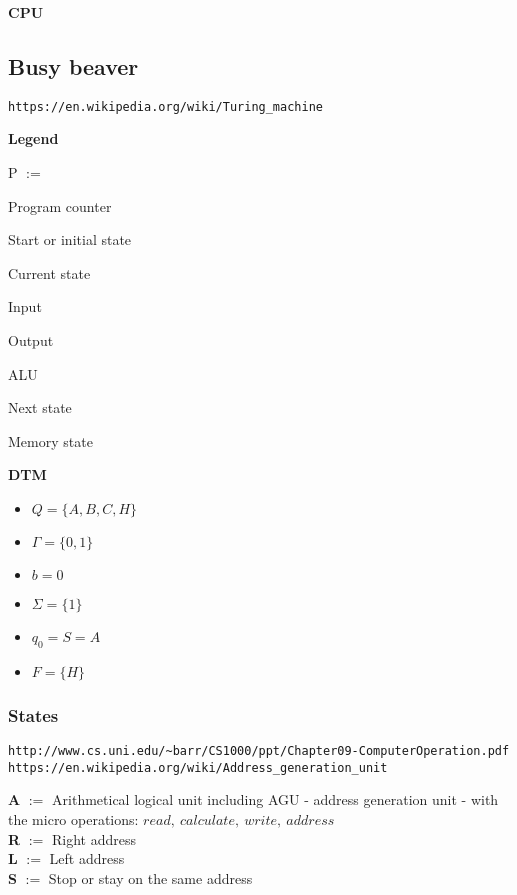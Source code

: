 \documentclass[10pt,a4paper]{article}
\begin{document}
\vskip 16pt
\bf {CPU}
\vskip 16pt


\subsection{Busy beaver}

\verb+https://en.wikipedia.org/wiki/Turing_machine+

\vskip 8pt
{\bf Legend}
  
\vskip 4pt
\begin{labeling}{\rm P $:=$ } 
  \setlength\itemsep{-3pt}
  \item[\rm P $:=$] \rm Program counter
  \item[S $:=$] Start or initial state
  \item[C $:=$] Current state
  \item[I $:=$] Input
  \item[O $:=$] Output
  \item[A $:=$] ALU
  \item[N $:=$] Next state
  \item[M $:=$] Memory state
\end{labeling}

\vskip 8pt
{\bf DTM}
  
\vskip 15pt
\hskip -15pt
\begin{minipage}{0.9\textwidth}
  \begin{itemize}
    \setlength\itemsep{0em}
    
  \item $Q = \{ A, B, C, H \}$
  \item $\Gamma = \{ 0, 1 \}$
  \item $b = 0$
  \item $\Sigma = \{ 1 \}$
  \item $q_0 = S = A$
  \item $F = \{ H \}$ 
    
  \end{itemize}
\end{minipage}

\subsubsection{States}
\verb+http://www.cs.uni.edu/~barr/CS1000/ppt/Chapter09-ComputerOperation.pdf+
\verb+https://en.wikipedia.org/wiki/Address_generation_unit+

\vskip 8pt
{\bf A} $:=$ \rm Arithmetical logical unit including AGU
- address generation unit - with the micro operations:
$read, \ calculate,\ write,\ address$ \\
{\bf R} $:=$ Right address \\
{\bf L} $:=$ Left address \\
{\bf S} $:=$ Stop or stay on the same address
\end{document}
